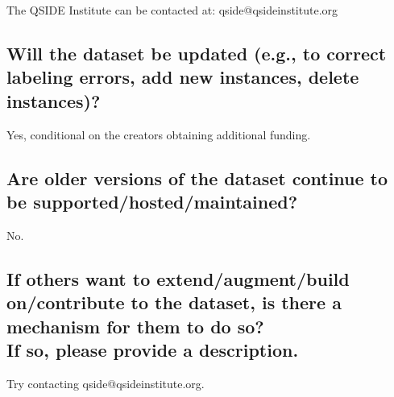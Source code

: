 \documentclass[letterpaper, 10 pt, conference]{ieeeconf}  %
\newcommand{\subtitle}[1]{{\\ \small \normalfont \color{purple} #1}}
\begin{document}
The QSIDE Institute can be contacted at: qside@qsideinstitute.org

\subsection{Will the dataset be updated (e.g., to correct labeling errors, add new instances, delete instances)?}

Yes, conditional on the creators obtaining additional funding.

\subsection{Are older versions of the dataset continue to be supported/hosted/maintained?}

No.

\subsection{If others want to extend/augment/build on/contribute to the dataset, is there a mechanism for them to do so? \subtitle{If so, please provide a description.}}

Try contacting qside@qsideinstitute.org.


\medskip
 
  

\end{document}
